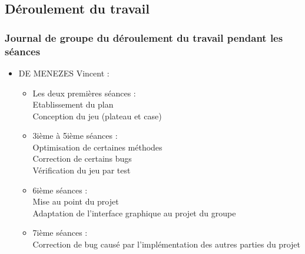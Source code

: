 \documentclass{beamer}
\begin{document}
\subsection{Déroulement du travail}
\begin{frame}
  \frametitle{Journal de groupe du déroulement du travail pendant les séances}
  \begin{itemize}
    \item DE MENEZES Vincent :\\
      \begin{itemize}
        \item Les deux premières séances :\\
          Etablissement du plan\\
          Conception du jeu (plateau et case)
        \item 3ième à 5ième séances :\\
          Optimisation de certaines méthodes\\
          Correction de certains bugs\\
          Vérification du jeu par test
        \item 6ième séances :\\
          Mise au point du projet\\
          Adaptation de l'interface graphique au projet du groupe\\
        \item 7ième séances :\\
          Correction de bug causé par l'implémentation des autres parties du projet
      \end{itemize}
  \end{itemize}
\end{frame}
\end{document}
